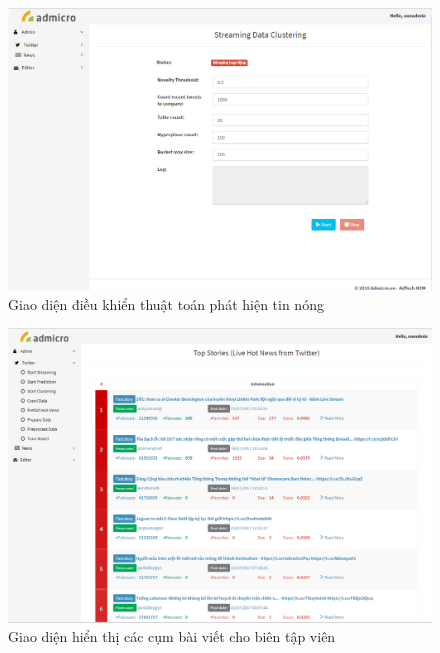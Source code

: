 \begin{figure}[H]
		\centering
	\includegraphics[width=0.96\linewidth]{Chapter3/Chapter3Figs/StartClustering}
	\caption{Giao diện điều khiển thuật toán phát hiện tin nóng}
	\label{fig:startclustering}
\end{figure}

\begin{figure}[H]
		\centering
	\includegraphics[width=0.96\linewidth]{Chapter3/Chapter3Figs/TopStories2}
	\caption{Giao diện hiển thị các cụm bài viết cho biên tập viên}
	\label{fig:topstories}
\end{figure}

